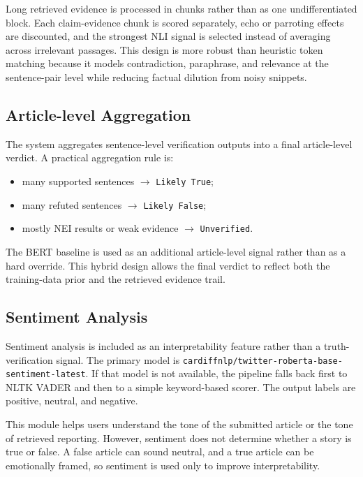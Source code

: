 \documentclass[11pt]{article}
\newcommand{\code}[1]{\texttt{#1}}
\begin{document}
Long retrieved evidence is processed in chunks rather than as one
undifferentiated block. Each claim-evidence chunk is scored separately, echo or
parroting effects are discounted, and the strongest NLI signal is selected
instead of averaging across irrelevant passages. This design is more robust than
heuristic token matching because it models contradiction, paraphrase, and
relevance at the sentence-pair level while reducing factual dilution from noisy
snippets.

\subsection{Article-level Aggregation}

The system aggregates sentence-level verification outputs into a final
article-level verdict. A practical aggregation rule is:

\begin{itemize}
    \item many supported sentences $\rightarrow$ \code{Likely True};
    \item many refuted sentences $\rightarrow$ \code{Likely False};
    \item mostly NEI results or weak evidence $\rightarrow$ \code{Unverified}.
\end{itemize}

The BERT baseline is used as an additional article-level signal rather than as a
hard override. This hybrid design allows the final verdict to reflect both the
training-data prior and the retrieved evidence trail.

\subsection{Sentiment Analysis}

Sentiment analysis is included as an interpretability feature rather than a
truth-verification signal. The primary model is
\code{cardiffnlp/twitter-roberta-base-sentiment-latest}. If that model is not
available, the pipeline falls back first to NLTK VADER and then to a simple
keyword-based scorer. The output labels are positive, neutral, and negative.

This module helps users understand the tone of the submitted article or the tone
of retrieved reporting. However, sentiment does not determine whether a story is
true or false. A false article can sound neutral, and a true article can be
emotionally framed, so sentiment is used only to improve interpretability.
\end{document}
